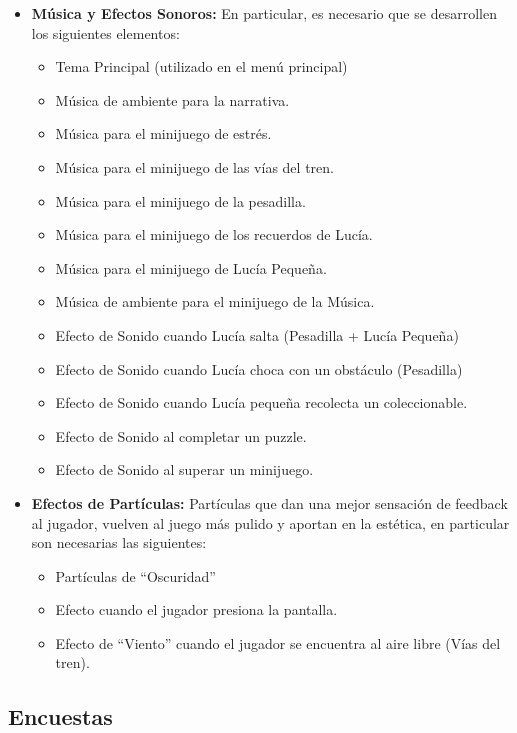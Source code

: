 \begin{itemize}
    \item \textbf{Música y Efectos Sonoros:} En particular, es necesario que se desarrollen los siguientes elementos:
    \begin{itemize}
        \item Tema Principal (utilizado en el menú principal)
        \item Música de ambiente para la narrativa.
        \item Música para el minijuego de estrés.
        \item Música para el minijuego de las vías del tren.
        \item Música para el minijuego de la pesadilla.
        \item Música para el minijuego de los recuerdos de Lucía.
        \item Música para el minijuego de Lucía Pequeña.
        \item Música de ambiente para el minijuego de la Música.
        \item Efecto de Sonido cuando Lucía salta (Pesadilla + Lucía Pequeña)
        \item Efecto de Sonido cuando Lucía choca con un obstáculo (Pesadilla)
        \item Efecto de Sonido cuando Lucía pequeña recolecta un coleccionable.
        \item Efecto de Sonido al completar un puzzle.
        \item Efecto de Sonido al superar un minijuego.
    \end{itemize}
    \item \textbf{Efectos de Partículas:} Partículas que dan una mejor sensación de feedback al jugador, vuelven al juego más pulido y aportan en la estética, en particular son necesarias las siguientes:
    \begin{itemize}
        \item Partículas de ``Oscuridad''
        \item Efecto cuando el jugador presiona la pantalla.
        \item Efecto de ``Viento'' cuando el jugador se encuentra al aire libre (Vías del tren).
    \end{itemize}
\end{itemize}


\newpage
\subsection{Encuestas}

